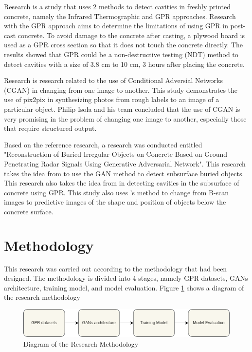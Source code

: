 \documentclass[conference]{IEEEtran}
\begin{document}
Research \cite{b2} is a study that uses 2 methods to detect cavities in freshly printed concrete, namely the Infrared Thermographic and GPR approaches. 
Research with the GPR approach aims to determine the limitations of using GPR in post-cast concrete. 
To avoid damage to the concrete after casting, a plywood board is used as a GPR cross section so that it does not touch the concrete directly. 
The results showed that GPR could be a non-destructive testing (NDT) method to detect cavities with a size of 3.8 cm to 10 cm, 3 hours after placing the concrete.

Research \cite{b3} is research related to the use of Conditional Adversial Networks (CGAN) in changing from one image to another. 
This study demonstrates the use of pix2pix in synthesizing photos from rough labels to an image of a particular object. 
Philip Isola and his team concluded that the use of CGAN is very promising in the problem of changing one image to another, especially those that require structured output.

Based on the reference research, a research was conducted entitled "Reconstruction of Buried Irregular Objects on Concrete Based on Ground-Penetrating Radar Signals Using Generative Adversarial Network". 
This research takes the idea from \cite{b1} to use the GAN method to detect subsurface buried objects. 
This research also takes the idea from \cite{b2} in detecting cavities in the subsurface of concrete using GPR. 
This study also uses \cite{b3}'s method to change from B-scan images to predictive images of the shape and position of objects below the concrete surface.

\section{Methodology}
This research was carried out according to the methodology that had been designed. 
The methodology is divided into 4 stages, namely GPR datasets, GANs architecture, training model, and model evaluation. 
Figure \ref{fig:metodologi} shows a diagram of the research methodology

\begin{figure}[ht]
  \centering
  \includegraphics[scale=0.35]{gambar/metodologiEN.png}
  \caption{Diagram of the Research Methodology}
  \label{fig:metodologi}
\end{figure}
\end{document}
